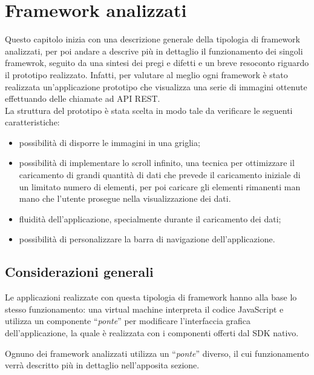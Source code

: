 
\chapter{Framework analizzati}
\label{cap:framework-analizzati}
Questo capitolo inizia con una descrizione generale della tipologia di framework analizzati, per poi andare a descrive più in dettaglio il funzionamento dei singoli framewrok, seguito da una sintesi dei pregi e difetti e un breve resoconto riguardo il prototipo realizzato.
Infatti, per valutare al meglio ogni framework è stato realizzata un'applicazione prototipo che visualizza una serie di immagini ottenute effettuando delle chiamate ad \gls{API} \gls{REST}.\\
La struttura del prototipo è stata scelta in modo tale da verificare le seguenti caratteristiche:
\begin{itemize}
\item possibilità di disporre le immagini in una griglia;
\item possibilità di implementare lo scroll infinito, una tecnica per ottimizzare il caricamento di grandi quantità di dati che prevede il caricamento iniziale di un limitato numero di elementi, per poi caricare gli elementi rimanenti man mano che l'utente prosegue nella visualizzazione dei dati.
\item fluidità dell'applicazione, specialmente durante il caricamento dei dati;
\item possibilità di personalizzare la barra di navigazione dell'applicazione.
\end{itemize}


\section{Considerazioni generali}
Le applicazioni realizzate con questa tipologia di framework hanno alla base lo stesso funzionamento: una \gls{virtual machine} interpreta il codice JavaScript e utilizza un componente ``\textit{ponte}'' per modificare l'interfaccia grafica dell'applicazione, la quale è realizzata con i componenti offerti dal \gls{SDK} nativo.

Ognuno dei framework analizzati utilizza un ``\textit{ponte}'' diverso, il cui funzionamento verrà descritto più in dettaglio nell'apposita sezione.

